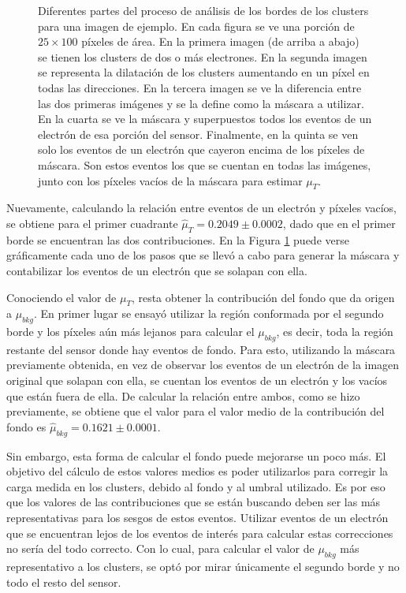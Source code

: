 \begin{figure}[H]
    \caption{Diferentes partes del proceso de análisis de los bordes de los clusters para una imagen de ejemplo. En cada figura se ve una porción de $25 \times 100$ píxeles de área. En la primera imagen (de arriba a abajo) se tienen los clusters de dos o más electrones. En la segunda imagen se representa la dilatación de los clusters aumentando en un píxel en todas las direcciones. En la tercera imagen se ve la diferencia entre las dos primeras imágenes y se la define como la máscara a utilizar. En la cuarta se ve la máscara y superpuestos todos los eventos de un electrón de esa porción del sensor. Finalmente, en la quinta se ven solo los eventos de un electrón que cayeron encima de los píxeles de máscara. Son estos eventos los que se cuentan en todas las imágenes, junto con los píxeles vacíos de la máscara para estimar $\mu_{T}$.}
    \label{fig:AnalisisBordes}
\end{figure}
Nuevamente, calculando la relación entre eventos de un electrón y píxeles vacíos, se obtiene para el primer cuadrante $\hat{\mu}_{T} = 0.2049 \pm 0.0002$, dado que en el primer borde se encuentran las dos contribuciones. En la Figura \ref{fig:AnalisisBordes} puede verse gráficamente cada uno de los pasos que se llevó a cabo para generar la máscara y contabilizar los eventos de un electrón que se solapan con ella.

Conociendo el valor de $\mu_{T}$, resta obtener la contribución del fondo que da origen a $\mu_{bkg}$. En primer lugar se ensayó utilizar la región conformada por el segundo borde y los píxeles aún más lejanos para calcular el $\mu_{bkg}$, es decir, toda la región restante del sensor donde hay eventos de fondo. Para esto, utilizando la máscara previamente obtenida, en vez de observar los eventos de un electrón de la imagen original que solapan con ella, se cuentan los eventos de un electrón y los vacíos que están fuera de ella. De calcular la relación entre ambos, como se hizo previamente, se obtiene que el valor para el valor medio de la contribución del fondo es $\hat{\mu}_{bkg} = 0.1621 \pm 0.0001$. 

Sin embargo, esta forma de calcular el fondo puede mejorarse un poco más. El objetivo del cálculo de estos valores medios es poder utilizarlos para corregir la carga medida en los clusters, debido al fondo y al umbral utilizado. Es por eso que los valores de las contribuciones que se están buscando deben ser las más representativas para los sesgos de estos eventos. Utilizar eventos de un electrón que se encuentran lejos de los eventos de interés para calcular estas correcciones no sería del todo correcto. Con lo cual, para calcular el valor de $\mu_{bkg}$ más representativo a los clusters, se optó por mirar únicamente el segundo borde y no todo el resto del sensor.

